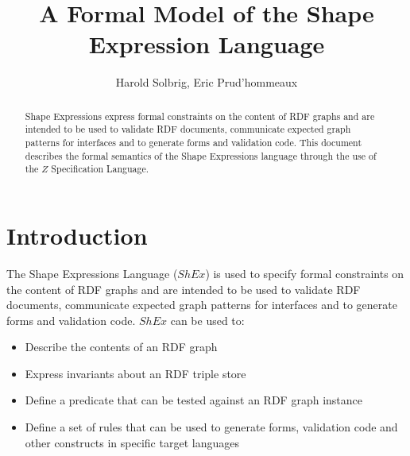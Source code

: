 \documentclass[fuzz]{llncs}
\begin{document}
 

\title{A Formal Model of the Shape Expression Language}


\author{%
  Harold Solbrig, Eric Prud'hommeaux}


%

\maketitle          

\begin{abstract}
Shape Expressions express formal constraints on the content of RDF graphs and are intended to be used to validate RDF documents, communicate expected graph patterns for interfaces and to generate forms and validation code.  This document describes the formal semantics of the Shape Expressions language through the use of the $Z$ Specification Language.
\end{abstract}
 


\section{Introduction}
The Shape Expressions Language ($ShEx$) is used to specify formal constraints on the content of RDF graphs and are intended to be used to validate RDF documents, communicate expected graph patterns for interfaces and to generate forms and validation code. $ShEx$ can be used to:
\begin{itemize}
\item Describe the contents of an RDF graph
\item Express invariants about an RDF triple store
\item Define a predicate that can be tested against an RDF graph instance
\item Define a set of rules that can be used to generate forms, validation code and other constructs in specific target languages
\end{itemize} 
\end{document}
